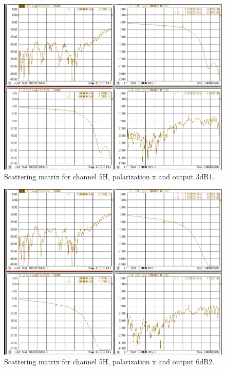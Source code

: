 \documentclass[12pt,a4paper,oneside]{article}
\begin{document}
\begin{figure}[H]
\centering
\includegraphics[width=0.9\linewidth]{VNA_results/5Hx_3dB1.png}
\caption{Scattering matrix for channel 5H, polarization x and output 3dB1.}
\label{fig:5Hx_3dB1}
\end{figure}


\begin{figure}[H]
\centering
\includegraphics[width=0.9\linewidth]{VNA_results/5Hx_6dB2.png}
\caption{Scattering matrix for channel 5H, polarization x and output 6dB2.}
\label{fig:5Hx_6dB2}
\end{figure}
\end{document}
